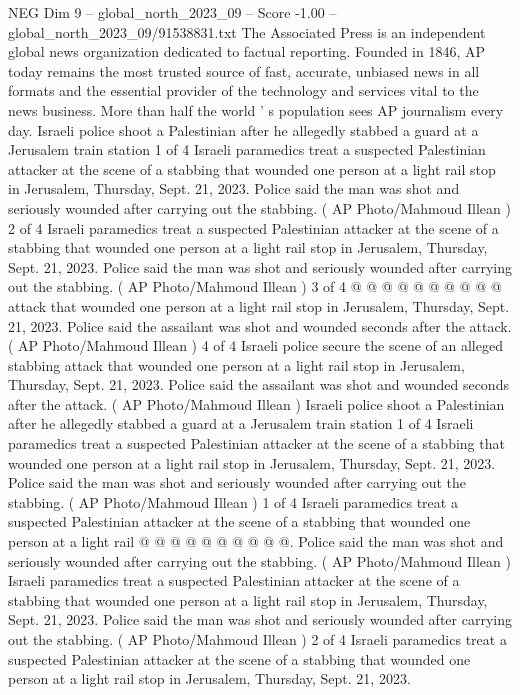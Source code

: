 \begin{textsample}{NEG Dim 9 – global\_north\_2023\_09 – Score -1.00 – global\_north\_2023\_09/91538831.txt}  \label{ex:f9_neg_044}
The Associated Press is an independent global news organization dedicated to factual reporting.
Founded in 1846, AP today remains the most trusted source of fast, accurate, unbiased news in all formats and the essential provider of the technology and services vital to the news business.
More than half the world ' s population sees AP journalism every day.
Israeli police shoot a Palestinian after he allegedly stabbed a guard at a Jerusalem train station 1 of 4 Israeli paramedics treat a suspected Palestinian attacker at the scene of a stabbing that wounded one person at a light rail stop in Jerusalem, Thursday, Sept. 21, 2023.
Police said the man was shot and seriously wounded after carrying out the stabbing. ( AP Photo/Mahmoud Illean ) 2 of 4 Israeli paramedics treat a suspected Palestinian attacker at the scene of a stabbing that wounded one person at a light rail stop in Jerusalem, Thursday, Sept. 21, 2023.
Police said the man was shot and seriously wounded after carrying out the stabbing. ( AP Photo/Mahmoud Illean ) 3 of 4 @ @ @ @ @ @ @ @ @ @ attack that wounded one person at a light rail stop in Jerusalem, Thursday, Sept. 21, 2023.
Police said the assailant was shot and wounded seconds after the attack. ( AP Photo/Mahmoud Illean ) 4 of 4 Israeli police secure the scene of an alleged stabbing attack that wounded one person at a light rail stop in Jerusalem, Thursday, Sept. 21, 2023.
Police said the assailant was shot and wounded seconds after the attack. ( AP Photo/Mahmoud Illean ) Israeli police shoot a Palestinian after he allegedly stabbed a guard at a Jerusalem train station 1 of 4 Israeli paramedics treat a suspected Palestinian attacker at the scene of a stabbing that wounded one person at a light rail stop in Jerusalem, Thursday, Sept. 21, 2023.
Police said the man was shot and seriously wounded after carrying out the stabbing. ( AP Photo/Mahmoud Illean ) 1 of 4 Israeli paramedics treat a suspected Palestinian attacker at the scene of a stabbing that wounded one person at a light rail @ @ @ @ @ @ @ @ @ @.
Police said the man was shot and seriously wounded after carrying out the stabbing. ( AP Photo/Mahmoud Illean ) Israeli paramedics treat a suspected Palestinian attacker at the scene of a stabbing that wounded one person at a light rail stop in Jerusalem, Thursday, Sept. 21, 2023.
Police said the man was shot and seriously wounded after carrying out the stabbing. ( AP Photo/Mahmoud Illean ) 2 of 4 Israeli paramedics treat a suspected Palestinian attacker at the scene of a stabbing that wounded one person at a light rail stop in Jerusalem, Thursday, Sept. 21, 2023.

\end{textsample}
